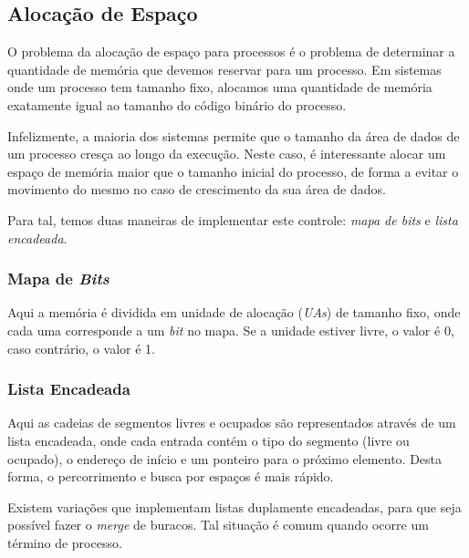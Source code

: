 \subsection{Alocação de Espaço}
O problema da alocação de espaço para processos é o problema de determinar a quantidade de memória que devemos reservar para um processo. Em sistemas onde um processo tem tamanho fixo, alocamos uma quantidade de memória exatamente igual ao tamanho do código binário do processo.

Infelizmente, a maioria dos sistemas permite que o tamanho da área de dados de um processo cresça ao longo da execução. Neste caso, é interessante alocar um espaço de memória maior que o tamanho inicial do processo, de forma a evitar o movimento do mesmo no caso de crescimento da sua área de dados.

Para tal, temos duas maneiras de implementar este controle: \textit{mapa de bits} e \textit{lista encadeada}.


\subsubsection{Mapa de \textit{Bits}}
Aqui a memória é dividida em unidade de alocação (\textit{UAs}) de tamanho fixo, onde cada uma corresponde a um \textit{bit} no mapa. Se a unidade estiver livre, o valor é 0, caso contrário, o valor é 1.



\subsubsection{Lista Encadeada}
Aqui as cadeias de segmentos livres e ocupados são representados através de um lista encadeada, onde cada entrada contém o tipo do segmento (livre ou ocupado), o endereço de início e um ponteiro para o próximo elemento. Desta forma, o percorrimento e busca por espaços é mais rápido.

Existem variações que implementam listas duplamente encadeadas, para que seja possível fazer o \textit{merge} de buracos. Tal situação é comum quando ocorre um término de processo.

















